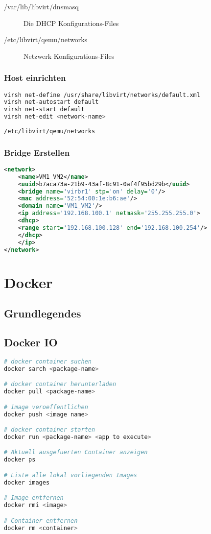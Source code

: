 \begin{description}
	\item[/var/lib/libvirt/dnsmasq] Die DHCP Konfigurations-Files 
	\item[/etc/libvirt/qemu/networks] Netzwerk Konfigurations-Files
\end{description}




\subsubsection{Host einrichten}
\begin{lstlisting}[language=bash]
virsh net-define /usr/share/libvirt/networks/default.xml
virsh net-autostart default
virsh net-start default
virsh net-edit <network-name>
\end{lstlisting}


\lstinline|/etc/libvirt/qemu/networks|

\subsubsection{Bridge Erstellen}
\begin{lstlisting}[language=xml]
<network>
	<name>VM1_VM2</name>
	<uuid>b7aca73a-21b9-43af-8c91-0af4f95bd29b</uuid>
	<bridge name='virbr1' stp='on' delay='0'/>
	<mac address='52:54:00:1e:b6:ae'/>
	<domain name='VM1_VM2'/>
	<ip address='192.168.100.1' netmask='255.255.255.0'>
	<dhcp>
	<range start='192.168.100.128' end='192.168.100.254'/>
	</dhcp>
	</ip>
</network>
\end{lstlisting}







\section{Docker}
\subsection{Grundlegendes}

\subsection{Docker IO}
\begin{lstlisting}[language=bash]
# docker container suchen
docker sarch <package-name>

# docker container herunterladen
docker pull <package-name>

# Image veroeffentlichen
docker push <image name>

# docker container starten
docker run <package-name> <app to execute>

# Aktuell ausgefuerten Container anzeigen
docker ps

# Liste alle lokal vorliegenden Images
docker images

# Image entfernen
docker rmi <image>

# Container entfernen
docker rm <container>
\end{lstlisting}


